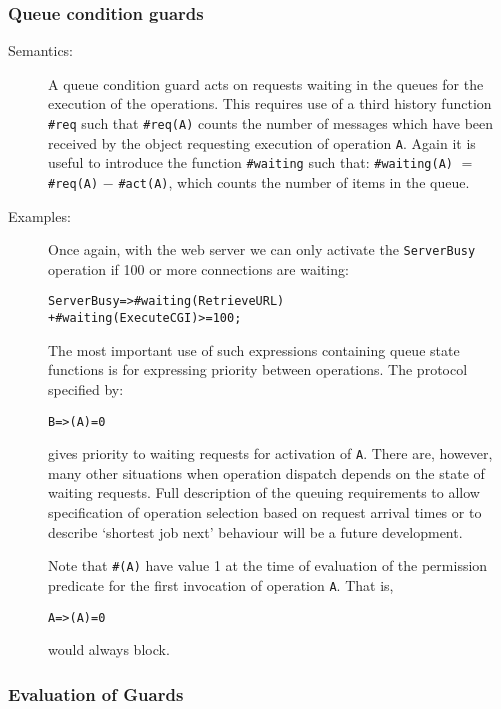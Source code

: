 \documentclass[\pformat,12pt]{article}
\begin{document}
\subsubsection{Queue condition guards}\label{queuesec}
\begin{description}
\item[Semantics:] 
A queue condition guard acts on requests waiting in the queues for the
execution of the operations.
This requires use of a third history function {\tt \#req} such that
{\tt \#req(A)} counts the number of messages which have been received by the
object requesting execution of operation {\tt A}.
Again it is useful to introduce the function {\tt \#waiting} such that:
{\tt \#waiting(}{\tt A}{\tt )} $=$ {\tt \#req(}{\tt A}{\tt )} $-$ {\tt \#act(}{\tt A}{\tt )},
which counts the number of items in the queue.

\item[Examples:] 
Once again, with the web server we can only activate the
\texttt{ServerBusy} operation if 100 or more connections are waiting:
\begin{alltt}
     ServerBusy  => #waiting(RetrieveURL) 
                      + #waiting(ExecuteCGI) >= 100;
\end{alltt}

The most important use of such expressions containing queue
state functions is for expressing priority between operations. The
protocol specified by:
\begin{alltt}
     B => (A) = 0
\end{alltt}
gives priority to waiting  requests for activation of {\tt A}. There
are, however, many other situations when operation dispatch depends on
the state of waiting requests.  Full description of the queuing
requirements to allow specification of operation selection based on
request arrival times or to describe `shortest job next' behaviour
will be a future development.

Note that \texttt{\#(A)} have value 1 at the time of evaluation of
the permission predicate for the first invocation of operation
\texttt{A}. That is,
\begin{alltt}
    A => (A) = 0
\end{alltt}
would always block.

\end{description}

\subsubsection{Evaluation of Guards}
\end{document}
